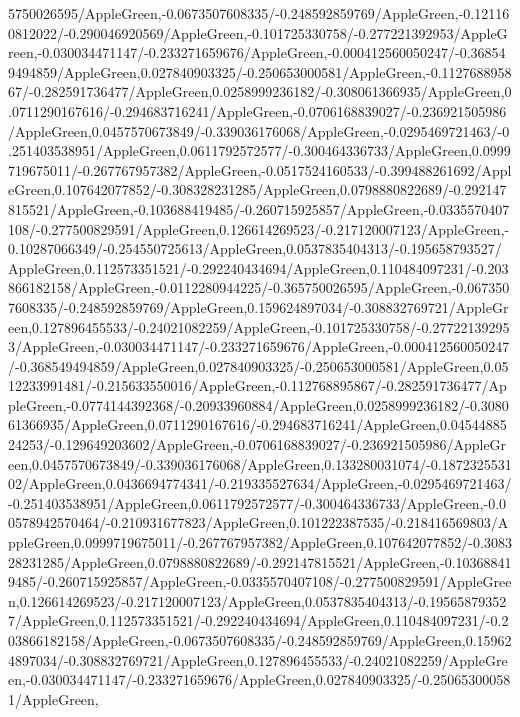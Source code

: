 {\begin{tikzternal}
{5750026595/AppleGreen,-0.0673507608335/-0.248592859769/AppleGreen,-0.121160812022/-0.290046920569/AppleGreen,-0.101725330758/-0.277221392953/AppleGreen,-0.030034471147/-0.233271659676/AppleGreen,-0.000412560050247/-0.368549494859/AppleGreen,0.027840903325/-0.250653000581/AppleGreen,-0.112768895867/-0.282591736477/AppleGreen,0.0258999236182/-0.308061366935/AppleGreen,0.0711290167616/-0.294683716241/AppleGreen,-0.0706168839027/-0.236921505986/AppleGreen,0.0457570673849/-0.339036176068/AppleGreen,-0.0295469721463/-0.251403538951/AppleGreen,0.0611792572577/-0.300464336733/AppleGreen,0.0999719675011/-0.267767957382/AppleGreen,-0.0517524160533/-0.399488261692/AppleGreen,0.107642077852/-0.308328231285/AppleGreen,0.0798880822689/-0.292147815521/AppleGreen,-0.103688419485/-0.260715925857/AppleGreen,-0.0335570407108/-0.277500829591/AppleGreen,0.126614269523/-0.217120007123/AppleGreen,-0.10287066349/-0.254550725613/AppleGreen,0.0537835404313/-0.195658793527/AppleGreen,0.112573351521/-0.292240434694/AppleGreen,0.110484097231/-0.203866182158/AppleGreen,-0.0112280944225/-0.365750026595/AppleGreen,-0.0673507608335/-0.248592859769/AppleGreen,0.159624897034/-0.308832769721/AppleGreen,0.127896455533/-0.24021082259/AppleGreen,-0.101725330758/-0.277221392953/AppleGreen,-0.030034471147/-0.233271659676/AppleGreen,-0.000412560050247/-0.368549494859/AppleGreen,0.027840903325/-0.250653000581/AppleGreen,0.0512233991481/-0.215633550016/AppleGreen,-0.112768895867/-0.282591736477/AppleGreen,-0.0774144392368/-0.20933960884/AppleGreen,0.0258999236182/-0.308061366935/AppleGreen,0.0711290167616/-0.294683716241/AppleGreen,0.0454488524253/-0.129649203602/AppleGreen,-0.0706168839027/-0.236921505986/AppleGreen,0.0457570673849/-0.339036176068/AppleGreen,0.133280031074/-0.187232553102/AppleGreen,0.0436694774341/-0.219335527634/AppleGreen,-0.0295469721463/-0.251403538951/AppleGreen,0.0611792572577/-0.300464336733/AppleGreen,-0.00578942570464/-0.210931677823/AppleGreen,0.101222387535/-0.218416569803/AppleGreen,0.0999719675011/-0.267767957382/AppleGreen,0.107642077852/-0.308328231285/AppleGreen,0.0798880822689/-0.292147815521/AppleGreen,-0.103688419485/-0.260715925857/AppleGreen,-0.0335570407108/-0.277500829591/AppleGreen,0.126614269523/-0.217120007123/AppleGreen,0.0537835404313/-0.195658793527/AppleGreen,0.112573351521/-0.292240434694/AppleGreen,0.110484097231/-0.203866182158/AppleGreen,-0.0673507608335/-0.248592859769/AppleGreen,0.159624897034/-0.308832769721/AppleGreen,0.127896455533/-0.24021082259/AppleGreen,-0.030034471147/-0.233271659676/AppleGreen,0.027840903325/-0.250653000581/AppleGreen,
}
\end{tikzternal}}
